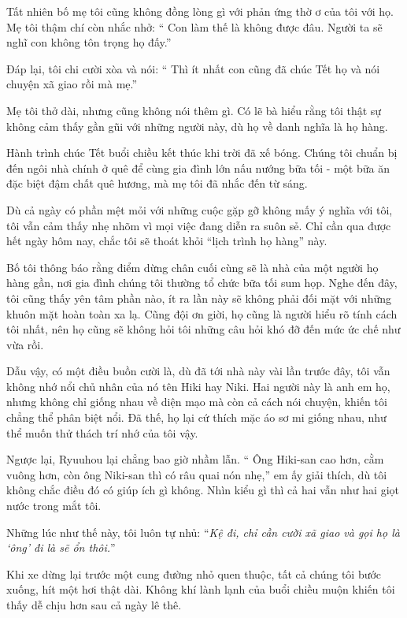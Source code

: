 \documentclass[../main.tex]{subfiles}
\begin{document}
Tất nhiên bố mẹ tôi cũng không đồng lòng gì với phản ứng thờ ơ của tôi với họ. Mẹ tôi thậm chí còn nhắc nhở: ``{\color{red} Con làm thế là không được đâu. Người ta sẽ nghĩ con không tôn trọng họ đấy.}''

Đáp lại, tôi chi cười xòa và nói: ``{\color{red} Thì ít nhất con cũng đã chúc Tết họ và nói chuyện xã giao rồi mà mẹ.}''

Mẹ tôi thở dài, nhưng cũng không nói thêm gì. Có lẽ bà hiểu rằng tôi thật sự không cảm thấy gần gũi với những người này, dù họ về danh nghĩa là họ hàng.

Hành trình chúc Tết buổi chiều kết thúc khi trời đã xế bóng. Chúng tôi chuẩn bị đến ngôi nhà chính ở quê để cùng gia đình lớn nấu nướng bữa tối - một bữa ăn đặc biệt đậm chất quê hương, mà mẹ tôi đã nhắc đến từ sáng.

Dù cả ngày có phần mệt mỏi với những cuộc gặp gỡ không mấy ý nghĩa với tôi, tôi vẫn cảm thấy nhẹ nhõm vì mọi việc đang diễn ra suôn sẻ. Chỉ cần qua được hết ngày hôm nay, chắc tôi sẽ thoát khỏi ``lịch trình họ hàng'' này.

Bố tôi thông báo rằng điểm dừng chân cuối cùng sẽ là nhà của một người họ hàng gần, nơi gia đình chúng tôi thường tổ chức bữa tối sum họp. Nghe đến đây, tôi cũng thấy yên tâm phần nào, ít ra lần này sẽ không phải đối mặt với những khuôn mặt hoàn toàn xa lạ. Cũng đội ơn giời, họ cũng là người hiểu rõ tính cách tôi nhất, nên họ cũng sẽ không hỏi tôi những câu hỏi khó đỡ đến mức ức chế như vừa rồi.

Dẫu vậy, có một điều buồn cười là, dù đã tới nhà này vài lần trước đây, tôi vẫn không nhớ nổi chủ nhân của nó tên Hiki hay Niki. Hai người này là anh em họ, nhưng không chỉ giống nhau về diện mạo mà còn cả cách nói chuyện, khiến tôi chẳng thể phân biệt nổi. Đã thế, họ lại cứ thích mặc áo sơ mi giống nhau, như thể muốn thử thách trí nhớ của tôi vậy.

Ngược lại, Ryuuhou lại chẳng bao giờ nhầm lẫn. ``{\color{red} Ông Hiki-san cao hơn, cằm vuông hơn, còn ông Niki-san thì có râu quai nón nhẹ,}'' em ấy giải thích, dù tôi không chắc điều đó có giúp ích gì không. Nhìn kiểu gì thì cả hai vẫn như hai giọt nước trong mắt tôi.

Những lúc như thế này, tôi luôn tự nhủ: ``\textit{Kệ đi, chỉ cần cười xã giao và gọi họ là `ông' đi là sẽ ổn thôi.}''

Khi xe dừng lại trước một cung đường nhỏ quen thuộc, tất cả chúng tôi bước xuống, hít một hơi thật dài. Không khí lành lạnh của buổi chiều muộn khiến tôi thấy dễ chịu hơn sau cả ngày lê thê.
\end{document}
